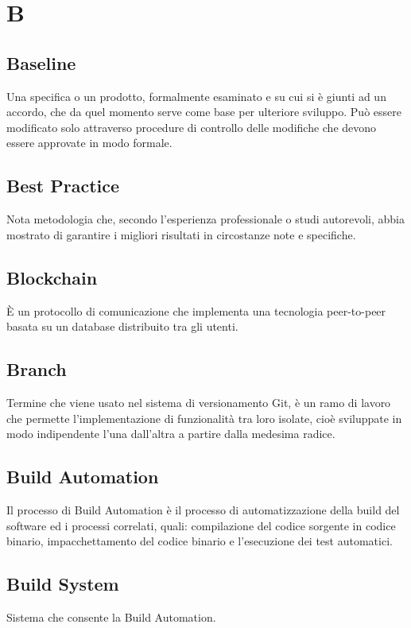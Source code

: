 \section*{B}

\subsection{Baseline}
Una specifica o un prodotto, formalmente esaminato e su cui si è giunti ad un accordo, che da quel momento serve come base per ulteriore sviluppo. Può essere modificato solo attraverso procedure di controllo delle modifiche che devono essere approvate in modo formale.

\subsection{Best Practice}
Nota metodologia che, secondo l'esperienza professionale o studi autorevoli, abbia mostrato di garantire i migliori risultati in circostanze note e specifiche.

\subsection{Blockchain}
È un protocollo di comunicazione che implementa una tecnologia peer-to-peer basata su un database distribuito tra gli utenti.

\subsection{Branch}
Termine che viene usato nel sistema di versionamento Git, è un ramo di lavoro che permette l'implementazione di funzionalità tra loro isolate, cioè sviluppate in modo indipendente l'una dall'altra a partire dalla medesima radice.

\subsection{Build Automation}
Il processo di Build Automation è il processo di automatizzazione della build del software ed i processi correlati, quali: compilazione del codice sorgente in codice binario, impacchettamento del codice binario e l'esecuzione dei test automatici.  

\subsection{Build System}
Sistema che consente la Build Automation.